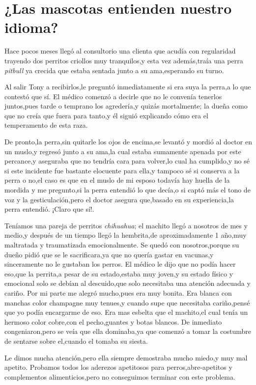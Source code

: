 \documentclass[letterpaper,12pt]{book}
\begin{document}
\chapter{¿Las mascotas entienden nuestro idioma?}
Hace pocos meses llegó al consultorio una clienta que acudía con regularidad trayendo dos perritos criollos muy tranquilos,y esta vez además,traía una perra \textit{pitbull} ya crecida que estaba sentada junto a su ama,esperando su turno.

Al salir Tony a recibirlos,le preguntó inmediatamente si era suya la perra,a lo que contestó que sí. El médico comenzó a decirle que no le convenía tenerlos juntos,pues tarde o temprano los agredería,y quizás mortalmente; la dueña como que no creía que fuera para tanto,y él siguió explicando cómo era el temperamento de esta raza.

De pronto,la perra,sin quitarle los ojos de encima,se levantó y mordió al doctor en un muslo,y regresó junto a su ama,la cual estaba sumamente apenada por este percance,y aseguraba que no tendría cara para volver,lo cual ha cumplido,y no sé si este incidente fue bastante elocuente para ella,y tampoco sé si conserva a la perra o no,el caso es que en el muslo de mi esposo todavía hay huella de la mordida y me pregunto,si la perra entendió lo que decía,o si captó más el tono de voz y la gesticulación,pero el doctor asegura que,basado en su experiencia,la perra entendió. ¡Claro que sí!.

Teníamos una pareja de perritos \textit{chihuahua}; el machito llegó a nosotros de mes y medio,y después de un tiempo llegó la hembrita,de aproximadamente 1 año,muy maltratada y traumatizada emocionalmente. Se quedó con nosotros,porque su dueño pidió que se le sacrificara,ya que no quería gastar en vacunas,y sinceramente no le gustaban los perros. El médico le dijo que no podía hacer eso,que la perrita,a pesar de su estado,estaba muy joven,y su estado físico y emocional solo se debían al descuido,que solo necesitaba una atención adecuada y cariño. Por mi parte me alegró mucho,pues era muy bonita. Era blanca con manchas color champagne muy tenues,y cuando supe que necesitaba cariño,pensé que yo podía encargarme de eso. Era mas esbelta que el machito,el cual tenía un hermoso color cobre,con el pecho,guantes y botas blancos. De inmediato congeniaron,pero se veía que ella dominaba,ya que comenzó a tomar la costumbre de sentarse sobre el,cuando el tomaba su siesta. 

Le dimos mucha atención,pero ella siempre demostraba mucho miedo,y muy mal apetito. Probamos todos los aderezos apetitosos para perros,abre-apetitos y complementos alimenticios,pero no conseguimos terminar con este problema. 
\end{document}
